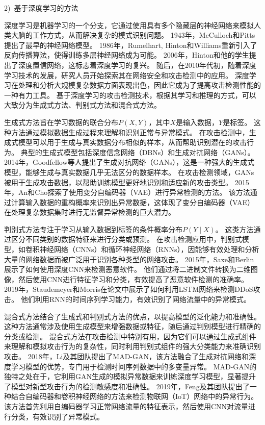 2)~基于深度学习的方法\par
深度学习是机器学习的一个分支，它通过使用具有多个隐藏层的神经网络来模拟人类大脑的工作方式，从而解决复杂的模式识别问题。
1943年，McCulloch和Pitts提出了最早的神经网络模型。
1986年，Rumelhart, Hinton和Williams重新引入了反向传播算法，使得训练多层神经网络成为可能。
2006年，Hinton和他的学生提出了深度置信网络，这标志着深度学习的复兴。
随后，在2010年代初，随着深度学习技术的发展，研究人员开始探索其在网络安全和攻击检测中的应用。
深度学习在处理和分析大规模复杂数据方面表现出色，因此它成为了提高攻击检测性能的一种有力工具。
基于深度学习的攻击检测技术，根据其学习和推理的方式，可以大致分为生成式方法、判别式方法和混合式方法。

生成式方法旨在学习数据的联合分布$P(X,Y)$，其中$X$是输入数据，$Y$是标签。
这种方法通过模拟数据生成过程来理解和识别正常与异常模式。
在攻击检测中，生成式模型可以用于生成与真实数据分布相似的样本，从而帮助识别潜在的攻击行为。
典型的生成式模型包括深度信念网络（DBNs）和生成对抗网络（GANs）。
2014年，Goodfellow等人提出了生成对抗网络（GANs）\cite{goodfellow2014generative}，这是一种强大的生成式模型，能够生成与真实数据几乎无法区分的数据样本。
在攻击检测领域，GANs被用于生成攻击数据，以帮助训练模型更好地识别和适应新的攻击类型。
2015年，An和Cho探索了使用变分自编码器（VAE）进行异常检测的方法\cite{an2015variational}。
该方法通过计算输入数据的重构概率来识别出异常数据，这体现了变分自编码器（VAE）在处理复杂数据集时进行无监督异常检测的巨大潜力。\par

判别式方法专注于学习从输入数据到标签的条件概率分布$P(Y∣X)$。
这类方法通过区分不同类别的数据特征来进行分类或预测。
在攻击检测应用中，判别式模型，如卷积神经网络（CNNs）和循环神经网络（RNNs），因能够有效处理和分析大量的网络数据而被广泛用于识别各种类型的网络攻击。
2015年，Saxe和Berlin展示了如何使用深度CNN来检测恶意软件\cite{saxe2015deep}。
他们通过将二进制文件转换为二维图像，然后使用CNN进行特征学习和分类，有效提高了恶意软件检测的准确率。
2019年，Staudemeyer和Morris\cite{staudemeyer2019applying}在论文中展示了如何利用LSTM网络来检测DDoS攻击。
他们利用RNN的时间序列学习能力，有效识别了网络流量中的异常模式。\par

混合式方法结合了生成式和判别式方法的优点，以提高模型的泛化能力和准确性。
这种方法通常涉及使用生成模型来增强数据或特征，随后通过判别模型进行精确的分类或检测。
混合式方法在攻击检测中特别有用，因为它们可以通过生成式组件来理解和模拟攻击行为的复杂性，同时利用判别式组件的强大分类能力来准确识别攻击。
2018年，Li及其团队提出了MAD-GAN\cite{li2018mad}，该方法融合了生成对抗网络和深度学习模型的优势，专门用于检测时间序列数据中的多变量异常。
MAD-GAN的独特之处在于，它利用GAN生成的模拟异常数据来训练深度学习模型，显著提升了模型对新型攻击行为的检测敏感度和准确性。
2019年，Feng及其团队提出了一种结合自编码器和卷积神经网络的方法来检测物联网（IoT）网络中的异常行为\cite{feng2019deep}。
该方法首先利用自编码器学习正常网络流量的特征表示，然后使用CNN对流量进行分类，有效识别了异常模式。

